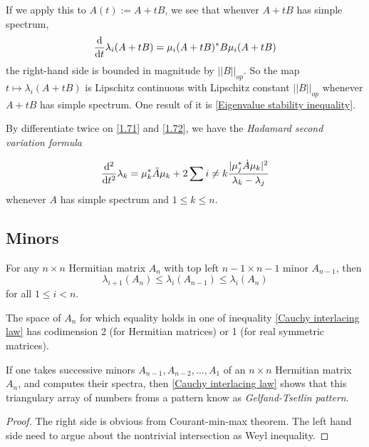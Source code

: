 If we apply this to $A(t):= A+tB$, we see that whenver $A+tB$ has simple spectrum, 
\begin{equation*}
    \frac{\mathrm{d}}{\mathrm{d} t}\lambda_i(A+tB) =\mu_i(A+tB)^*B\mu_i(A+tB)
\end{equation*}
the right-hand side is bounded in magnitude by $||B||_{op}$. So the map $t\mapsto \lambda_i (A+tB)$ is Lipschitz continuous with Lipschitz constant $||B||_{op}$ whenever $A+tB$ has simple spectrum. 
One result of it is \ref{Eigenvalue stability inequality}.

By differentiate twice on \ref{1.71} and \ref{1.72}, we have the \textit{Hadamard second variation formula}
\begin{proposition}
    $$\frac{\mathrm{d} ^2}{\mathrm{d} t^2} \lambda_k=\mu_k^* \ddot{A} \mu_k + 2\sum{i\neq k} \frac{|\mu_j^* \dot{A} \mu_k|^2 }{\lambda_k-\lambda_j} $$
    whenever $A$ has simple spectrum and $1\leq k \leq n$.
\end{proposition}

\subsection{Minors}

\begin{proposition}
    For any $n\times n$ Hermitian matrix $A_n$ with top left $n-1\times n-1$ minor $A_{n-1}$, then 
    \begin{equation}\label{Cauchy interlacing law}
        \lambda_{i+1}(A_n) \leq \lambda_i(A_{n-1}) \leq \lambda_i(A_n)
    \end{equation}
    for all $1\leq i < n.$

    The space of $A_n$ for which equality holds in one of inequality \ref{Cauchy interlacing law} has codimension 2 (for Hermitian matrices) or 1 (for real symmetric matrices).
\end{proposition}

\begin{remark}
    If one takes successive minors $A_{n-1},A_{n-2},\dots,A_1$ of an $n\times n$ Hermitian matrix $A_n$, and computes their spectra, then \ref{Cauchy interlacing law} shows that this triangulary array of numbers froms a pattern know as \textit{Gelfand-Tsetlin pattern}.
\end{remark}

\begin{proof}
    The right side is obvious from Courant-min-max theorem. The left hand side need to argue about the nontrivial intersection as Weyl inequality.
\end{proof}

